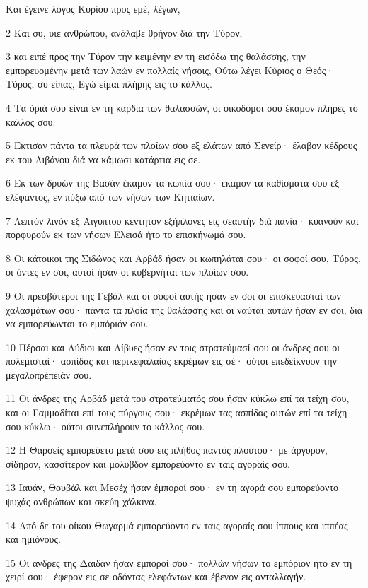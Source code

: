 \par Και έγεινε λόγος Κυρίου προς εμέ, λέγων,
\par 2 Και συ, υιέ ανθρώπου, ανάλαβε θρήνον διά την Τύρον,
\par 3 και ειπέ προς την Τύρον την κειμένην εν τη εισόδω της θαλάσσης, την εμπορευομένην μετά των λαών εν πολλαίς νήσοις, Ούτω λέγει Κύριος ο Θεός· Τύρος, συ είπας, Εγώ είμαι πλήρης εις το κάλλος.
\par 4 Τα όριά σου είναι εν τη καρδία των θαλασσών, οι οικοδόμοι σου έκαμον πλήρες το κάλλος σου.
\par 5 Έκτισαν πάντα τα πλευρά των πλοίων σου εξ ελάτων από Σενείρ· έλαβον κέδρους εκ του Λιβάνου διά να κάμωσι κατάρτια εις σε.
\par 6 Εκ των δρυών της Βασάν έκαμον τα κωπία σου· έκαμον τα καθίσματά σου εξ ελέφαντος, εν πύξω από των νήσων των Κητιαίων.
\par 7 Λεπτόν λινόν εξ Αιγύπτου κεντητόν εξήπλονες εις σεαυτήν διά πανία· κυανούν και πορφυρούν εκ των νήσων Ελεισά ήτο το επισκήνωμά σου.
\par 8 Οι κάτοικοι της Σιδώνος και Αρβάδ ήσαν οι κωπηλάται σου· οι σοφοί σου, Τύρος, οι όντες εν σοι, αυτοί ήσαν οι κυβερνήται των πλοίων σου.
\par 9 Οι πρεσβύτεροι της Γεβάλ και οι σοφοί αυτής ήσαν εν σοι οι επισκευασταί των χαλασμάτων σου· πάντα τα πλοία της θαλάσσης και οι ναύται αυτών ήσαν εν σοι, διά να εμπορεύωνται το εμπόριόν σου.
\par 10 Πέρσαι και Λύδιοι και Λίβυες ήσαν εν τοις στρατεύμασί σου οι άνδρες σου οι πολεμισταί· ασπίδας και περικεφαλαίας εκρέμων εις σέ· ούτοι επεδείκνυον την μεγαλοπρέπειάν σου.
\par 11 Οι άνδρες της Αρβάδ μετά του στρατεύματός σου ήσαν κύκλω επί τα τείχη σου, και οι Γαμμαδίται επί τους πύργους σου· εκρέμων τας ασπίδας αυτών επί τα τείχη σου κύκλω· ούτοι συνεπλήρουν το κάλλος σου.
\par 12 Η Θαρσείς εμπορεύετο μετά σου εις πλήθος παντός πλούτου· με άργυρον, σίδηρον, κασσίτερον και μόλυβδον εμπορεύοντο εν ταις αγοραίς σου.
\par 13 Ιαυάν, Θουβάλ και Μεσέχ ήσαν έμποροί σου· εν τη αγορά σου εμπορεύοντο ψυχάς ανθρώπων και σκεύη χάλκινα.
\par 14 Από δε του οίκου Θωγαρμά εμπορεύοντο εν ταις αγοραίς σου ίππους και ιππέας και ημιόνους.
\par 15 Οι άνδρες της Δαιδάν ήσαν έμποροί σου· πολλών νήσων το εμπόριον ήτο εν τη χειρί σου· έφερον εις σε οδόντας ελεφάντων και έβενον εις ανταλλαγήν.
